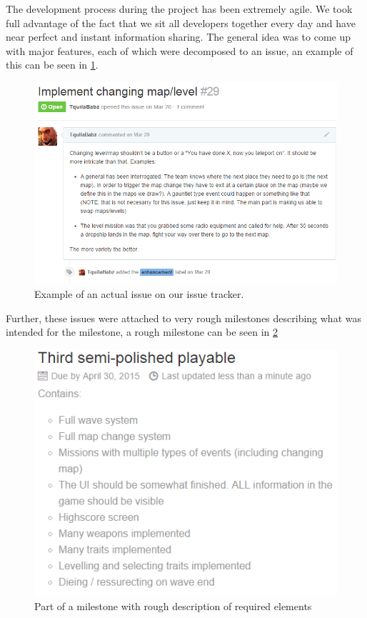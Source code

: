 The development process during the project has been extremely agile. We took full advantage of the fact that we sit all developers together every day and have near perfect and instant information sharing. The general idea was to come up with major features, each of which were decomposed to an issue, an example of this can be seen in \ref{evaluation:workprocess:issue}. 

\begin{figure}[H]\label{evaluation:workprocess:issue}
\centering
\includegraphics[width=1\textwidth]{figures/evaluation/issue}
\caption{Example of an actual issue on our issue tracker.}
\end{figure}

Further, these issues were attached to very rough milestones describing what was intended for the milestone, a rough milestone can be seen in \ref{evaluation:workprocess:milestone}

\begin{figure}[H]\label{evaluation:workprocess:milestone}
\centering
\includegraphics[width=1\textwidth]{figures/evaluation/milestone}
\caption{Part of a milestone with rough description of required elements}
\end{figure}

